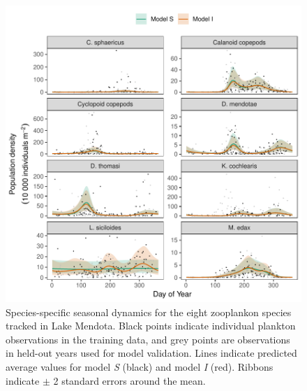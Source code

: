 \documentclass[12pt]{article}
\begin{document}
\begin{figure}
\centering
\includegraphics{../figures/zoo_comm_plot-1.pdf}
\caption{\label{fig:zoo_comp}Species-specific seasonal dynamics for the
eight zooplankon species tracked in Lake Mendota. Black points indicate
individual plankton observations in the training data, and grey points
are observations in held-out years used for model validation. Lines
indicate predicted average values for model \emph{S} (black) and model
\emph{I} (red). Ribbons indicate \(\pm\) 2 standard errors around the
mean.}
\end{figure}
\end{document}
